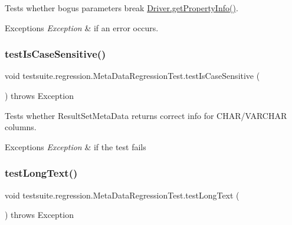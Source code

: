 Tests whether bogus parameters break \mbox{\hyperlink{classcom_1_1mysql_1_1cj_1_1jdbc_1_1_non_registering_driver_ad132531e673998633349a65c4c3eb402}{Driver.\+get\+Property\+Info()}}.


\begin{DoxyExceptions}{Exceptions}
{\em Exception} & if an error occurs. \\
\hline
\end{DoxyExceptions}
\mbox{\label{classtestsuite_1_1regression_1_1_meta_data_regression_test_adb0e8b0fcde945a0ebdfbd318975979b}} 
\subsubsection{\texorpdfstring{test\+Is\+Case\+Sensitive()}{testIsCaseSensitive()}}
{\footnotesize\ttfamily void testsuite.\+regression.\+Meta\+Data\+Regression\+Test.\+test\+Is\+Case\+Sensitive (\begin{DoxyParamCaption}{ }\end{DoxyParamCaption}) throws Exception}

Tests whether Result\+Set\+Meta\+Data returns correct info for C\+H\+A\+R/\+V\+A\+R\+C\+H\+AR columns.


\begin{DoxyExceptions}{Exceptions}
{\em Exception} & if the test fails \\
\hline
\end{DoxyExceptions}
\mbox{\label{classtestsuite_1_1regression_1_1_meta_data_regression_test_abc6512da546efa8175bd8245a997d554}} 
\subsubsection{\texorpdfstring{test\+Long\+Text()}{testLongText()}}
{\footnotesize\ttfamily void testsuite.\+regression.\+Meta\+Data\+Regression\+Test.\+test\+Long\+Text (\begin{DoxyParamCaption}{ }\end{DoxyParamCaption}) throws Exception}

